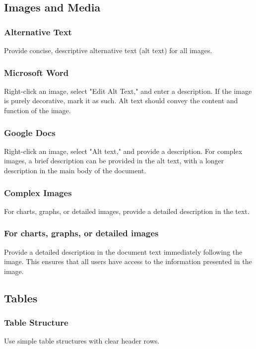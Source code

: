 \subsection{Images and Media}\label{ch15:ssec:images-media}

\subsubsection{Alternative Text}\label{ch15:sssec:alt-text}
Provide concise, descriptive alternative text (alt text) for all images.

\subsubsection{Microsoft Word}\label{ch15:sssec:word-alt-text}
Right-click an image, select "Edit Alt Text," and enter a description. If the image is purely decorative, mark it as such. Alt text should convey the content and function of the image.

\subsubsection{Google Docs}\label{ch15:sssec:docs-alt-text}
Right-click an image, select "Alt text," and provide a description. For complex images, a brief description can be provided in the alt text, with a longer description in the main body of the document.

\subsubsection{Complex Images}\label{ch15:sssec:complex-images}
For charts, graphs, or detailed images, provide a detailed description in the text.

\subsubsection{For charts, graphs, or detailed images}\label{ch15:sssec:charts-etc}
Provide a detailed description in the document text immediately following the image. This ensures that all users have access to the information presented in the image.

\subsection{Tables}\label{ch15:ssec:tables}

\subsubsection{Table Structure}\label{ch15:sssec:table-structure}
Use simple table structures with clear header rows.

